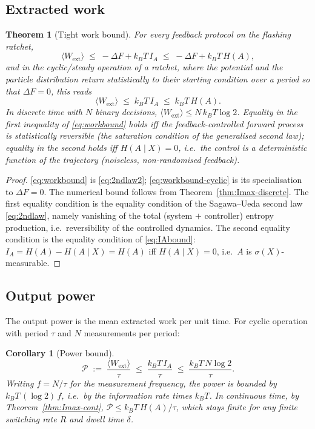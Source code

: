 \documentclass{amsart}
\newtheorem{theorem}{Theorem}
\newtheorem{corollary}{Corollary}
\theoremstyle{definition}
\newcommand{\kB}{k_{B}}
\newcommand{\Wext}{\langle W_{\mathrm{ext}}\rangle}
\begin{document}
\subsection{Extracted work}

\begin{theorem}[Tight work bound]\label{thm:work}
For every feedback protocol on the flashing ratchet,
\begin{equation}\label{eq:workbound}
\Wext \;\le\; -\Delta F + \kB T\,I_A \;\le\; -\Delta F + \kB T\,H(A),
\end{equation}
and in the cyclic/steady operation of a ratchet, where the potential and the
particle distribution return statistically to their starting condition over a
period so that $\Delta F=0$, this reads
\begin{equation}\label{eq:workbound-cyclic}
\Wext \;\le\; \kB T\, I_A \;\le\; \kB T\, H(A).
\end{equation}
In discrete time with $N$ binary decisions, $\Wext\le N\,\kB T\log2$. Equality
in the first inequality of \eqref{eq:workbound} holds iff the feedback-controlled
forward process is statistically reversible (the saturation condition of the
generalised second law); equality in the second holds iff $H(A\mid X)=0$, i.e.\
the control is a deterministic function of the trajectory (noiseless,
non-randomised feedback).
\end{theorem}

\begin{proof}
\eqref{eq:workbound} is \eqref{eq:2ndlaw2}; \eqref{eq:workbound-cyclic} is its
specialisation to $\Delta F=0$. The numerical bound follows from
Theorem~\ref{thm:Imax-discrete}. The first equality condition is the
equality condition of the Sagawa--Ueda second law \eqref{eq:2ndlaw}, namely
vanishing of the total (system $+$ controller) entropy production, i.e.\
reversibility of the controlled dynamics. The second equality condition is the
equality condition of \eqref{eq:IAbound}: $I_A=H(A)-H(A\mid X)=H(A)$ iff
$H(A\mid X)=0$, i.e.\ $A$ is $\sigma(X)$-measurable.
\end{proof}

\subsection{Output power}

The output power is the mean extracted work per unit time. For cyclic
operation with period $\tau$ and $N$ measurements per period:

\begin{corollary}[Power bound]\label{cor:power}
\begin{equation}\label{eq:power}
\mathcal P \;:=\; \frac{\Wext}{\tau}\;\le\;\frac{\kB T\,I_A}{\tau}
\;\le\;\frac{\kB T\,N\log2}{\tau}.
\end{equation}
Writing $f=N/\tau$ for the measurement frequency, the power is bounded by
$\kB T\,(\log2)\,f$, i.e.\ by the information \emph{rate} times $\kB T$. In
continuous time, by Theorem~\ref{thm:Imax-cont},
$\mathcal P\le \kB T\,H(A)/\tau$, which stays finite for any finite switching
rate $R$ and dwell time $\delta$.
\end{corollary}
\end{document}

